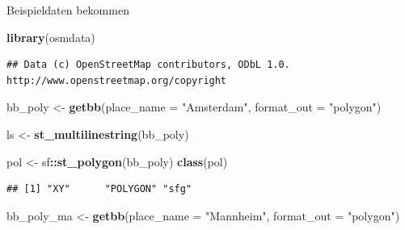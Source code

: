 \documentclass[ignorenonframetext,]{beamer}
\newenvironment{Shaded}{\begin{snugshade}}{\end{snugshade}}
\newcommand{\DataTypeTok}[1]{\textcolor[rgb]{0.13,0.29,0.53}{#1}}
\newcommand{\KeywordTok}[1]{\textcolor[rgb]{0.13,0.29,0.53}{\textbf{#1}}}
\newcommand{\NormalTok}[1]{#1}
\newcommand{\OperatorTok}[1]{\textcolor[rgb]{0.81,0.36,0.00}{\textbf{#1}}}
\newcommand{\StringTok}[1]{\textcolor[rgb]{0.31,0.60,0.02}{#1}}
\begin{document}
\begin{frame}[fragile]{Beispieldaten bekommen}
\protect\hypertarget{beispieldaten-bekommen}{}

\begin{Shaded}
\begin{Highlighting}[]
\KeywordTok{library}\NormalTok{(osmdata)}
\end{Highlighting}
\end{Shaded}

\begin{verbatim}
## Data (c) OpenStreetMap contributors, ODbL 1.0. http://www.openstreetmap.org/copyright
\end{verbatim}

\begin{Shaded}
\begin{Highlighting}[]
\NormalTok{bb_poly <-}\StringTok{ }\KeywordTok{getbb}\NormalTok{(}\DataTypeTok{place_name =} \StringTok{"Amsterdam"}\NormalTok{, }
                 \DataTypeTok{format_out =} \StringTok{"polygon"}\NormalTok{)}
\end{Highlighting}
\end{Shaded}

\begin{Shaded}
\begin{Highlighting}[]
\NormalTok{ls <-}\StringTok{ }\KeywordTok{st_multilinestring}\NormalTok{(bb_poly)}
\end{Highlighting}
\end{Shaded}

\begin{Shaded}
\begin{Highlighting}[]
\NormalTok{pol <-}\StringTok{ }\NormalTok{sf}\OperatorTok{::}\KeywordTok{st_polygon}\NormalTok{(bb_poly)}
\KeywordTok{class}\NormalTok{(pol)}
\end{Highlighting}
\end{Shaded}

\begin{verbatim}
## [1] "XY"      "POLYGON" "sfg"
\end{verbatim}

\begin{Shaded}
\begin{Highlighting}[]
\NormalTok{bb_poly_ma <-}\StringTok{ }\KeywordTok{getbb}\NormalTok{(}\DataTypeTok{place_name =} \StringTok{"Mannheim"}\NormalTok{, }
                 \DataTypeTok{format_out =} \StringTok{"polygon"}\NormalTok{)}
\end{Highlighting}
\end{Shaded}

\end{frame}
\end{document}
